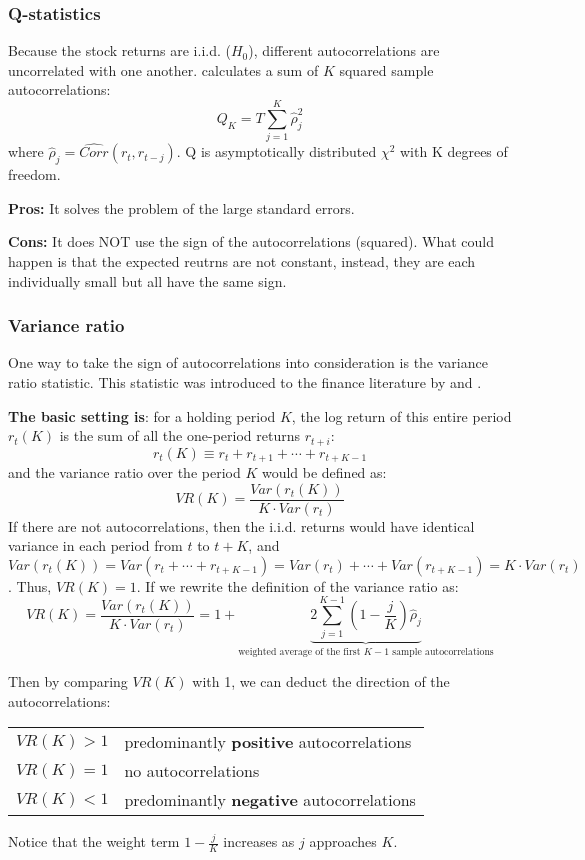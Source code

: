\subsubsection{Q-statistics}
Because the stock returns are i.i.d. ($H_0$), different autocorrelations are uncorrelated with one another.
\citet{box1970distribution} calculates a sum of $K$ squared sample autocorrelations:
\begin{equation}
    Q_K = T\sum^K_{j=1}\hat{\rho}^2_j
\end{equation}
where $\hat{\rho}_j=\hat{Corr}(r_t,r_{t-j})$. Q is asymptotically distributed $\chi^2$ with K degrees of freedom.

\textbf{Pros:} It solves the problem of the large standard errors.

\textbf{Cons:} It does NOT use the sign of the autocorrelations (squared). What could happen is that the expected reutrns are
not constant, instead, they are each individually small but all have the same sign.

\subsubsection{Variance ratio}
One way to take the sign of autocorrelations into consideration is the variance ratio statistic.
This statistic was introduced to the finance literature by \citet{lo1988stock} and \citet{poterba1988mean}.

\textbf{The basic setting is}: for a holding period $K$, the log return of this entire period $r_t(K)$ is the sum of all the one-period returns $r_{t+i}$:
$$
r_t(K) \equiv r_t + r_{t+1} + \cdots + r_{t+K-1}
$$
and the variance ratio over the period $K$ would be defined as:
$$
    VR(K) = \frac{Var(r_t(K))}{K\cdot Var(r_{t})}
$$
If there are not autocorrelations, then the i.i.d. returns would have identical variance in each period from $t$ to $t+K$,
and $Var(r_t(K)) = Var(r_t+\cdots+r_{t+K-1})=Var(r_t)+\cdots+Var(r_{t+K-1})=K\cdot Var(r_t)$. Thus, $VR(K)=1$. If we rewrite
the definition of the variance ratio as:
\begin{equation}
    VR(K) = \frac{Var(r_t(K))}{K\cdot Var(r_{t})} = 1+\underbrace{2\sum^{K-1}_{j=1}\left(1-\frac{j}{K}\right)\hat{\rho}_j}_{\text{weighted average of the first $K-1$ sample autocorrelations}}
\end{equation}

Then by comparing $VR(K)$ with 1, we can deduct the direction of the autocorrelations:
\begin{center}
    \begin{tabular}{rl}
    \hline
    $VR(K) > 1$ & predominantly \textbf{positive} autocorrelations  \\ 
    $VR(K) = 1$ & no autocorrelations \\ 
    $VR(K) < 1$ & predominantly \textbf{negative} autocorrelations \\ 
    \hline
    \end{tabular}
\end{center}
Notice that the weight term $1-\frac{j}{K}$ increases as $j$ approaches $K$.

